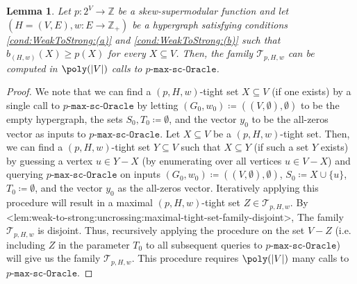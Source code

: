 \documentclass{article}
\def\Cref#1{<#1>}%
\newtheorem{lemma}{Lemma}[section]
\newcommand{\functionMaximizationOracleStrongCover}[1]{\ensuremath{{#1}\text{-}\mathtt{max}\text{-}\mathtt{sc}\text{-}\mathtt{Oracle}}\xspace}
\newcommand{\maximalTightSetFamily}[1]{\ensuremath{\calT_{#1}}\xspace}
\providecommand{\Z}{\mathbb{Z}}
\providecommand{\calT}{\mathcal{T}}
\begin{document}
 \begin{lemma}\label{lem:WeakToStrong::maximal-tight-set-family-computed-in-strongly-polytime}
 Let $p:2^V\rightarrow\Z$ be a skew-supermodular function and let $\left(H = (V, E), w:E \rightarrow\Z_+\right)$ be a hypergraph satisfying conditions \ref{cond:WeakToStrong:(a)} and \ref{cond:WeakToStrong:(b)} such that $b_{(H,w)}(X) \geq p(X)$ for every $X \subseteq V$. Then, the family $\maximalTightSetFamily{p, H, w}$ can be computed in $\poly(|V|)$ calls to \functionMaximizationOracleStrongCover{p}.
\end{lemma}
\begin{proof}
    We note that we can find a $(p, H, w)$-tight set $X\subseteq V$ 
    (if one exists) by a single call to \functionMaximizationOracleStrongCover{p} by letting  $(G_0, w_0) \coloneqq  \left((V, \emptyset), \emptyset\right)$ to be the empty hypergraph, the sets $S_0, T_0 \coloneqq  \emptyset$, and the vector $y_0$ to be the all-zeros vector as inputs to $\functionMaximizationOracleStrongCover{{p}}$. 
    Let $X \subseteq V$ be a $(p, H, w)$-tight set. Then, we can find a $(p, H, w)$-tight set $Y \subseteq V$ such that $X \subseteq Y$ (if such a set $Y$ exists) by guessing a vertex $u \in Y - X$ (by enumerating over all vertices $u \in V - X$) and querying $\functionMaximizationOracleStrongCover{p}$ on inputs  $(G_0, w_0) \coloneqq  \left((V, \emptyset), \emptyset\right)$, $S_0 \coloneqq  X \cup \{u\}$, $T_0 \coloneqq  \emptyset$, and the vector $y_0$ as the all-zeros vector. Iteratively applying this procedure will result in a maximal $(p, H, w)$-tight set $Z \in \maximalTightSetFamily{p, H, w}$. By \Cref{lem:weak-to-strong:uncrossing:maximal-tight-set-family-disjoint}, The family $\maximalTightSetFamily{p, H, w}$ is disjoint. Thus, recursively applying the procedure on the set $V - Z$ (i.e. including $Z$ in the parameter $T_0$ to all subsequent queries to \functionMaximizationOracleStrongCover{p}) will give us the family $\maximalTightSetFamily{p, H, w}$. This procedure requires  $\poly(|V|)$ many calls to \functionMaximizationOracleStrongCover{p}.
    \end{proof}
\end{document}
